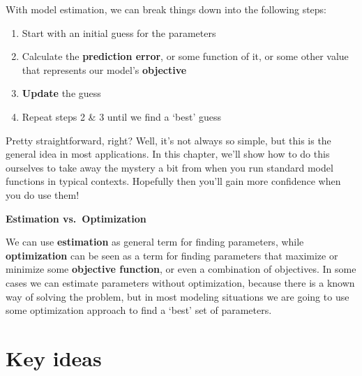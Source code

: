 \documentclass[
  letterpaper,
]{krantz}
\providecommand{\tightlist}{%
  \setlength{\itemsep}{0pt}\setlength{\parskip}{0pt}}\usepackage{longtable,booktabs,array}
\begin{document}
With model estimation, we can break things down into the following
steps:

\begin{enumerate}
\def\labelenumi{\arabic{enumi}.}
\tightlist
\item
  Start with an initial guess for the parameters
\item
  Calculate the \textbf{prediction error}, or some function of it, or
  some other value that represents our model's \textbf{objective}
\item
  \textbf{Update} the guess
\item
  Repeat steps 2 \& 3 until we find a `best' guess
\end{enumerate}

Pretty straightforward, right? Well, it's not always so simple, but this
is the general idea in most applications. In this chapter, we'll show
how to do this ourselves to take away the mystery a bit from when you
run standard model functions in typical contexts. Hopefully then you'll
gain more confidence when you do use them!

\begin{tcolorbox}[enhanced jigsaw, leftrule=.75mm, opacityback=0, left=2mm, rightrule=.15mm, arc=.35mm, colback=white, bottomrule=.15mm, toprule=.15mm, breakable]

\textbf{Estimation vs.~Optimization}\vspace{2mm}

We can use \textbf{estimation} as general term for finding parameters,
while \textbf{optimization} can be seen as a term for finding parameters
that maximize or minimize some \textbf{objective function}, or even a
combination of objectives. In some cases we can estimate parameters
without optimization, because there is a known way of solving the
problem, but in most modeling situations we are going to use some
optimization approach to find a `best' set of parameters.

\end{tcolorbox}

\section{Key ideas}\label{key-ideas-2}
\end{document}
